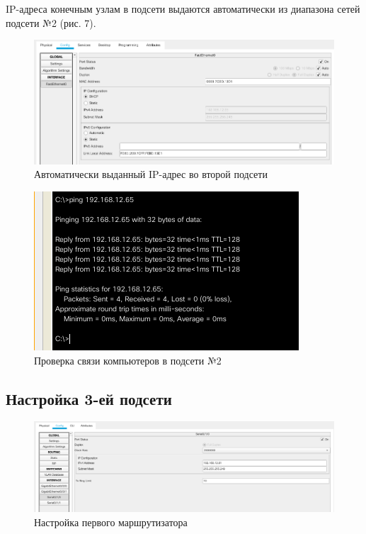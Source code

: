 \documentclass[12pt]{report}
\begin{document}
IP-адреса конечным узлам в подсети выдаются автоматически из диапазона сетей подсети №2 (рис. 7).

\begin{figure}[H]
	\begin{center}
		\includegraphics[scale=0.45]{img/7.png}
	\end{center}
	\caption{Автоматически выданный IP-адрес во второй подсети}
	\label{fig:7}
\end{figure}

\begin{figure}[H]
	\begin{center}
		\includegraphics[scale=0.75]{img/8.png}
	\end{center}
	\caption{Проверка связи компьютеров в подсети №2}
	\label{fig:8}
\end{figure}

\subsection*{Настройка 3-ей подсети}

\begin{figure}[H]
	\begin{center}
		\includegraphics[scale=0.4]{img/9.png}
	\end{center}
	\caption{Настройка первого маршрутизатора}
	\label{fig:9}
\end{figure}
\end{document}
